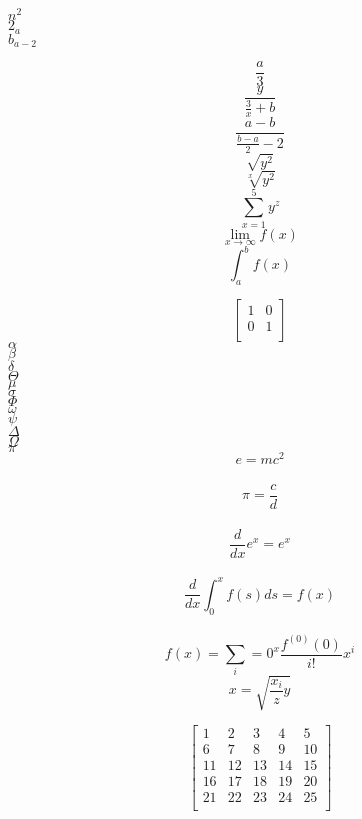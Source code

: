 \documentclass[a4paper,12pt]{report}
\begin{document}
$n^2$
\\
$2_a$
\\
$b_{a-2}$

$$\frac{a}{3}$$
$$\frac{y}{\frac{3}{x}+b}$$
$$\frac{a-b}{\frac{b-a}{2}-2}$$
$$\sqrt{y^2}$$
$$\sqrt[x]{y^2}$$
$$\sum_{x=1}^5 y^z$$
$$\lim_{x\to\infty} f(x)$$
$$\int_a^b f(x)$$

\begin{equation*}
\left[
\begin{matrix}
1&0\\
0&1\\
\end{matrix}
\right]
\end{equation*}
$\alpha$
\\
$\beta$
\\
$\delta$
\\
$\Theta$
\\
$\mu$
\\
$\sigma$
\\
$\Phi$
\\
$\omega$
\\
$\psi$
\\
$\Delta$
\\
$\Omega$
\\
$\pi$
\\


$$e  =  mc^2 $$\\

$$\pi  = \frac{c}{d} $$\\


$$\frac{d}{dx}e^x  =  e^x$$\\
$$\frac{d}{dx} \int_0^x f(s) ds  = f(x)$$\\
$$f(x) =\sum_{i} = 0^x \frac{f^{(0)} (0)}{i!} x^i $$
$$ x= \sqrt{\frac{x_i}{z} y} $$

\begin{equation*}
\left[
\begin{matrix}


1&2&3&4&5\\
6 &7 &8 &9 &10\\
11 &12& 13& 14& 15\\
16 &17 &18 &19 &20\\
21 &22& 23& 24 &25\\
\end{matrix}
\right]
\end{equation*}
\end{document}
